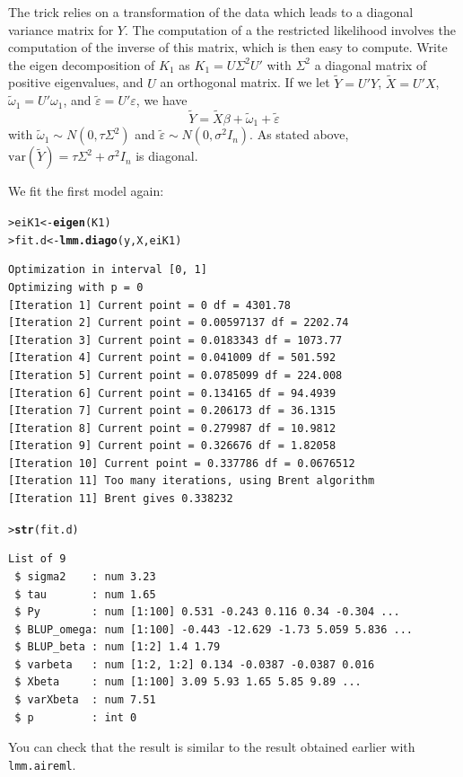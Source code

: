 \documentclass{article}\usepackage[]{graphicx}\usepackage[]{color}
\makeatletter
\newcommand{\hlstd}[1]{\textcolor[rgb]{0.345,0.345,0.345}{#1}}%
\newcommand{\hlkwb}[1]{\textcolor[rgb]{0.69,0.353,0.396}{#1}}%
\newcommand{\hlkwd}[1]{\textcolor[rgb]{0.737,0.353,0.396}{\textbf{#1}}}%
\newenvironment{kframe}{%
 \def\at@end@of@kframe{}%
 \ifinner\ifhmode%
  \def\at@end@of@kframe{\end{minipage}}%
  \begin{minipage}{\columnwidth}%
 \fi\fi%
 \def\FrameCommand##1{\hskip\@totalleftmargin \hskip-\fboxsep
 \colorbox{shadecolor}{##1}\hskip-\fboxsep
     \hskip-\linewidth \hskip-\@totalleftmargin \hskip\columnwidth}%
 \MakeFramed {\advance\hsize-\width
   \@totalleftmargin\z@ \linewidth\hsize
   \@setminipage}}%
 {\par\unskip\endMakeFramed%
 \at@end@of@kframe}
\newenvironment{knitrout}{}{} %
\makeatother
\begin{document}
  The trick relies on a transformation of the data which leads to a diagonal variance matrix for $Y$. 
  The computation of a the restricted likelihood
  involves the computation of the inverse of this matrix, which is then easy to compute.
  Write the eigen decomposition of $K_1$ as $K_1 = U \Sigma^2 U'$ with $\Sigma^2$
  a diagonal matrix of positive eigenvalues, and $U$ an orthogonal matrix.
  If we let $\tilde Y = U'Y$, $\tilde X = U'X$, $\tilde \omega_1 = U' \omega_1$, and
  $\tilde\varepsilon = U' \varepsilon$, we have
  $$ \tilde Y = \tilde X\beta + \tilde \omega_1 + \tilde \varepsilon $$
  with $\tilde \omega_1 \sim N\left(0,\tau \Sigma^2\right)$ and $ \tilde\varepsilon \sim N(0,\sigma^2 I_n) $.
  As stated above, $\mathrm{var}\left(\tilde Y\right) = \tau \Sigma^2 + \sigma^2 I_n$ is diagonal.

  We fit the first model again:
 
\begin{knitrout}
\color{fgcolor}\begin{kframe}
\begin{alltt}
\hlstd{> }\hlstd{eiK1} \hlkwb{<-} \hlkwd{eigen}\hlstd{(K1)}
\hlstd{> }\hlstd{fit.d} \hlkwb{<-} \hlkwd{lmm.diago}\hlstd{(y, X, eiK1)}
\end{alltt}
\begin{verbatim}
Optimization in interval [0, 1]
Optimizing with p = 0
[Iteration 1] Current point = 0 df = 4301.78
[Iteration 2] Current point = 0.00597137 df = 2202.74
[Iteration 3] Current point = 0.0183343 df = 1073.77
[Iteration 4] Current point = 0.041009 df = 501.592
[Iteration 5] Current point = 0.0785099 df = 224.008
[Iteration 6] Current point = 0.134165 df = 94.4939
[Iteration 7] Current point = 0.206173 df = 36.1315
[Iteration 8] Current point = 0.279987 df = 10.9812
[Iteration 9] Current point = 0.326676 df = 1.82058
[Iteration 10] Current point = 0.337786 df = 0.0676512
[Iteration 11] Too many iterations, using Brent algorithm
[Iteration 11] Brent gives 0.338232
\end{verbatim}
\begin{alltt}
\hlstd{> }\hlkwd{str}\hlstd{(fit.d)}
\end{alltt}
\begin{verbatim}
List of 9
 $ sigma2    : num 3.23
 $ tau       : num 1.65
 $ Py        : num [1:100] 0.531 -0.243 0.116 0.34 -0.304 ...
 $ BLUP_omega: num [1:100] -0.443 -12.629 -1.73 5.059 5.836 ...
 $ BLUP_beta : num [1:2] 1.4 1.79
 $ varbeta   : num [1:2, 1:2] 0.134 -0.0387 -0.0387 0.016
 $ Xbeta     : num [1:100] 3.09 5.93 1.65 5.85 9.89 ...
 $ varXbeta  : num 7.51
 $ p         : int 0
\end{verbatim}
\end{kframe}
\end{knitrout}
  You can check that the result is similar to the result obtained earlier with 
  \verb!lmm.aireml!.
\end{document}
